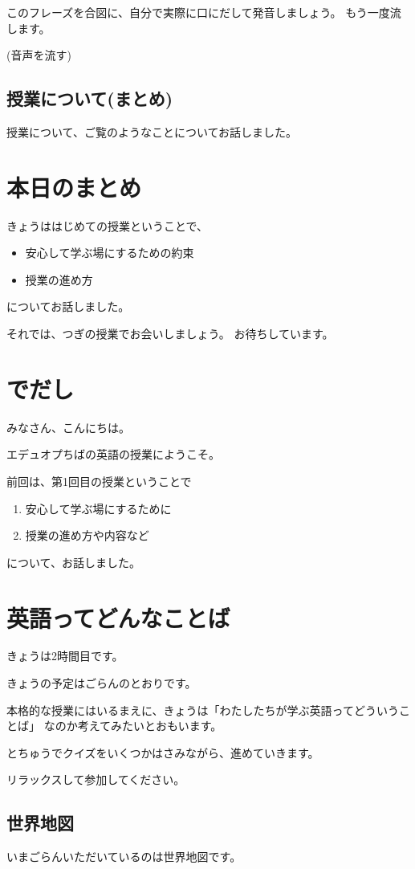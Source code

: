 \documentclass[12pt]{jlreq}
\begin{document}
このフレーズを合図に、自分で実際に口にだして発音しましょう。
もう一度流します。

(音声を流す)


\subsection{授業について(まとめ)}
授業について、ご覧のようなことについてお話しました。

\section{本日のまとめ}

きょうははじめての授業ということで、
\begin{itemize}
\item  安心して学ぶ場にするための約束
\item  授業の進め方
\end{itemize}
についてお話しました。

それでは、つぎの授業でお会いしましょう。
お待ちしています。
\newpage
\setcounter{section}{0}
\section{でだし}
みなさん、こんにちは。

エデュオプちばの英語の授業にようこそ。

前回は、第1回目の授業ということで
\begin{enumerate}
 \item 安心して学ぶ場にするために
 \item 授業の進め方や内容など
\end{enumerate}
について、お話しました。


\section{英語ってどんなことば}

きょうは2時間目です。

きょうの予定はごらんのとおりです。

本格的な授業にはいるまえに、きょうは「わたしたちが学ぶ英語ってどういうことば」
なのか考えてみたいとおもいます。

とちゅうでクイズをいくつかはさみながら、進めていきます。

リラックスして参加してください。

\subsection{世界地図}
いまごらんいただいているのは世界地図です。
\end{document}
